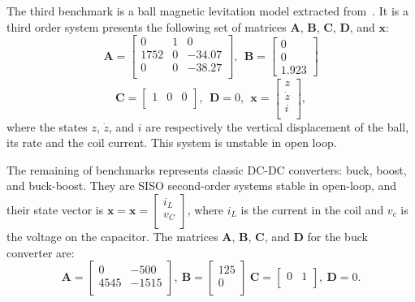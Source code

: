 \documentclass[runningheads,a4paper]{llncs}
\begin{document}
The third benchmark is a ball magnetic levitation model extracted from~\cite{maglev}. It is a third order system presents the following set of matrices $\textbf{A}$, $\textbf{B}$, $\textbf{C}$, $\textbf{D}$, and $\textbf{x}$:
$$
\textbf{A}=\left[\begin{array}{ccc}
0		& 1 		& 0		\\
1752	& 0			& -34.07\\
0		& 0			& -38.27\\
\end{array}\right],~~ \textbf{B} = \left[\begin{array}{c}
0 \\ 0 \\ 1.923
\end{array}\right]
$$
%
$$
\textbf{C}=\left[\begin{array}{ccc}
1 & 0 & 0\\
\end{array}\right],~~ \textbf{D}= 0,~~ \textbf{x}=\left[\begin{array}{c}
z \\ \dot{z} \\ i \\
\end{array}\right],
$$
where the states $z$, $\dot{z}$, and $i$ are respectively the vertical displacement of the ball, its rate and the coil current. This system  is unstable in open loop.

The remaining of benchmarks represents classic DC-DC converters: buck, boost, and buck-boost. They are SISO second-order systems stable in open-loop, and their state vector is $\textbf{x}=\textbf{x}=\left[\begin{array}{c}
i_{L} \\ v_{C}\\
\end{array}\right]$, where $i_{L}$ is the current in the coil and $v_{c}$ is the voltage on the capacitor. The matrices $\textbf{A}$, $\textbf{B}$, $\textbf{C}$, and $\textbf{D}$ for the buck converter are:
$$
\textbf{A}=\left[\begin{array}{cc}
0		& -500 \\
4545	& -1515\\
\end{array}\right],~ \textbf{B} = \left[\begin{array}{c}
125 \\ 0 \\
\end{array}\right]~
\textbf{C}=\left[\begin{array}{cc}
0 & 1\\
\end{array}\right],~ \textbf{D}= 0.
$$
\end{document}
